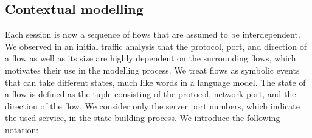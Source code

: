 \subsection{Contextual modelling}
Each session is now a sequence of flows that are assumed to be interdependent. %
We observed in an initial traffic analysis that the protocol, port, and direction of a flow as well as its size are highly dependent on the surrounding flows, %
which motivates their use in the modelling process. We treat flows as symbolic events that can take different states, much like words in a language model. The state of a flow is defined as the tuple consisting of the protocol, network port, and the direction of the flow. %
We consider only the server port numbers, which indicate the used service, in the state-building process.
We introduce the following notation:

